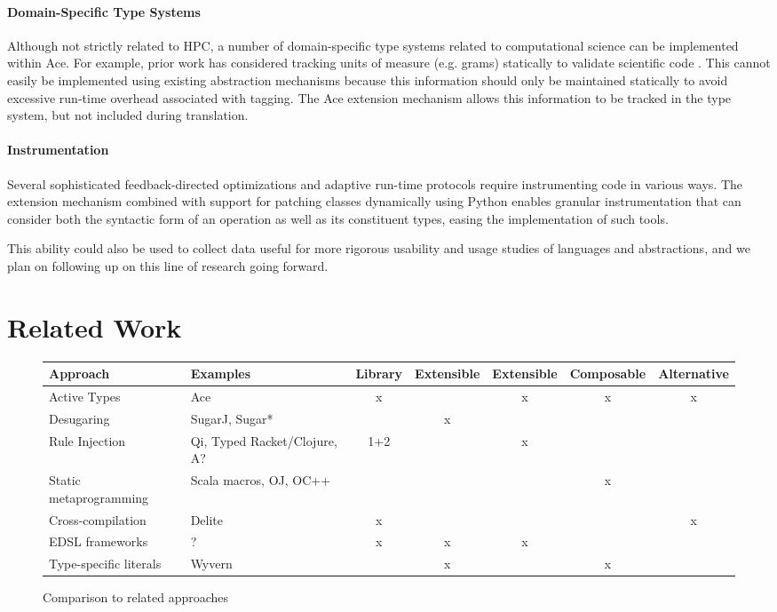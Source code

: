 \documentclass[9pt,preprint]{sigplanconf}
\begin{document}
\paragraph{Domain-Specific Type Systems}
Although not strictly related to HPC, a number of domain-specific type systems related to computational science can be implemented within Ace. For example, prior work has considered tracking units of measure (e.g. grams) statically to validate scientific code \cite{conf/cefp/Kennedy09}. This cannot easily be implemented using existing abstraction mechanisms because this information should only be maintained statically to avoid excessive run-time overhead associated with tagging. The Ace extension mechanism allows this information to be tracked in the type system, but not included during translation.


\paragraph{Instrumentation}
Several sophisticated feedback-directed optimizations and adaptive run-time protocols require instrumenting code in various ways. The extension mechanism combined with support for patching classes dynamically using Python enables granular instrumentation that can consider both the syntactic form of an operation as well as its constituent types, easing the implementation of such tools.

This ability could also be used to collect data useful for more rigorous usability and usage studies of languages and abstractions, and we plan on following up on this line of research going forward.



\section{Related Work}\label{related}
\begin{figure*}
\begin{tabular}[t]{ l | l | c c c c c }
\textbf{Approach} & \textbf{Examples} & Library & {Extensible} & Extensible & Composable & Alternative \\
\hline
Active Types & Ace & x & ~ & x & x & x\\
Desugaring & SugarJ, Sugar* & ~ & x & ~ & ~ & ~\\
Rule Injection & Qi, Typed Racket/Clojure, A? & 1+2 & ~ & x & ~ & ~\\
Static metaprogramming & Scala macros, OJ, OC++ & ~ & ~ & ~ & x & ~\\
Cross-compilation & Delite & x & ~ & ~ & ~ & x\\
EDSL frameworks & ? & x & x & x & ~ & ~\\
Type-specific literals & Wyvern & ~ & x & ~ & x & ~\\
\end{tabular}
\caption{Comparison to related approaches}
\end{figure*}
\end{document}
